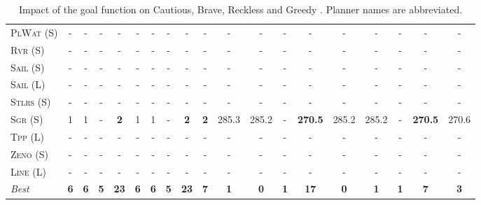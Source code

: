 \documentclass[11pt,landscape]{article}
\begin{document}
\begin{table}[tb]
{\begin{tabular}{|l||ccccccccc||ccccccccc||}
\textsc{PlWat} (S)&-&-&-&-&-&-&-&-&-&-&-&-&-&-&-&-&-&-\\
\textsc{Rvr} (S)&-&-&-&-&-&-&-&-&-&-&-&-&-&-&-&-&-&-\\
\textsc{Sail} (S)&-&-&-&-&-&-&-&-&-&-&-&-&-&-&-&-&-&-\\
\textsc{Sail} (L)&-&-&-&-&-&-&-&-&-&-&-&-&-&-&-&-&-&-\\
\textsc{Stlrs} (S)&-&-&-&-&-&-&-&-&-&-&-&-&-&-&-&-&-&-\\
\textsc{Sgr} (S)&1&1&-&\textbf{2}&1&1&-&\textbf{2}&\textbf{2}&285.3&285.2&-&\textbf{270.5}&285.2&285.2&-&\textbf{270.5}&270.6\\
\textsc{Tpp} (L)&-&-&-&-&-&-&-&-&-&-&-&-&-&-&-&-&-&-\\
\textsc{Zeno} (S)&-&-&-&-&-&-&-&-&-&-&-&-&-&-&-&-&-&-\\
\textsc{Line} (L)&-&-&-&-&-&-&-&-&-&-&-&-&-&-&-&-&-&-
\\\hline
\textit{Best}&\textbf{6}&\textbf{6}&\textbf{5}&\textbf{23}&\textbf{6}&\textbf{6}&\textbf{5}&\textbf{23}&\textbf{7}&\textbf{1}&\textbf{0}&\textbf{1}&\textbf{17}&\textbf{0}&\textbf{1}&\textbf{1}&\textbf{7}&\textbf{3}\\\hline

        \end{tabular}}
        \caption{Impact of the goal function on Cautious, Brave, Reckless and Greedy \pattyd. Planner names are abbreviated.}
        \label{tab:abl-gf}
        \end{table}
        
\end{document}
